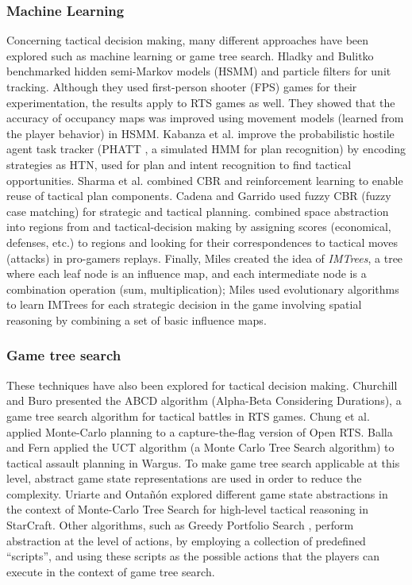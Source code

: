 \documentclass{llncs}
\begin{document}
\subsubsection*{Machine Learning}
Concerning tactical  decision making,  many different  approaches have
been explored  such as machine  learning or game tree  search.  Hladky
and  Bulitko \cite{Hladky2008}  benchmarked hidden  semi-Markov models
(HSMM)  and particle  filters for  unit tracking.  Although they  used
first-person  shooter  (FPS)  games  for  their  experimentation,  the
results apply to  RTS games as well. They showed  that the accuracy of
occupancy maps  was improved using  movement models (learned  from the
player behavior)  in HSMM. Kabanza  et al. \cite{OBRecog}  improve the
probabilistic  hostile  agent  task  tracker  (PHATT  \cite{PHATT},  a
simulated HMM  for plan  recognition) by  encoding strategies  as HTN,
used   for   plan   and    intent   recognition   to   find   tactical
opportunities.   Sharma  et   al.  \cite{CBR-RL}   combined  CBR   and
reinforcement   learning   to   enable    reuse   of   tactical   plan
components. Cadena and Garrido  \cite{CadenaG11} used fuzzy CBR (fuzzy
case       matching)       for      strategic       and       tactical
planning.  \cite{SynnaeveTactics}  combined   space  abstraction  into
regions   from  \cite{Perkins10}   and  tactical-decision   making  by
assigning scores  (economical, defenses, etc.) to  regions and looking
for their  correspondences to  tactical moves (attacks)  in pro-gamers
replays.  Finally,  Miles \cite{miles2006co} created the  idea of {\em
  IMTrees}, a tree where each leaf  node is an influence map, and each
intermediate node  is a  combination operation  (sum, multiplication);
Miles used evolutionary algorithms to learn IMTrees for each strategic
decision in the game involving spatial reasoning by combining a set of
basic influence maps.

\subsubsection*{Game  tree search}
These  techniques  have  also  been  explored  for  tactical  decision
making. Churchill and Buro \cite{churchill2012fast} presented the ABCD
algorithm  (Alpha-Beta  Considering  Durations), a  game  tree  search
algorithm   for   tactical   battles   in   RTS   games.    Chung   et
al. \cite{Chung05} applied Monte-Carlo  planning to a capture-the-flag
version  of Open  RTS.   Balla  and Fern  \cite{UCT}  applied the  UCT
algorithm (a  Monte Carlo Tree  Search algorithm) to  tactical assault
planning in Wargus. To make game tree search applicable at this level,
abstract game  state representations are  used in order to  reduce the
complexity. Uriarte and Onta\~{n}\'{o}n \cite{uriarte2014high,uriarte2014game} explored different game state abstractions in the context of Monte-Carlo Tree Search for high-level tactical reasoning in StarCraft. Other algorithms, such as Greedy Portfolio Search \cite{churchill2013portfolio}, perform abstraction at the level of actions, by employing a collection of predefined ``scripts'', and using these scripts as the possible actions that the players can execute in the context of game tree search.
\end{document}
